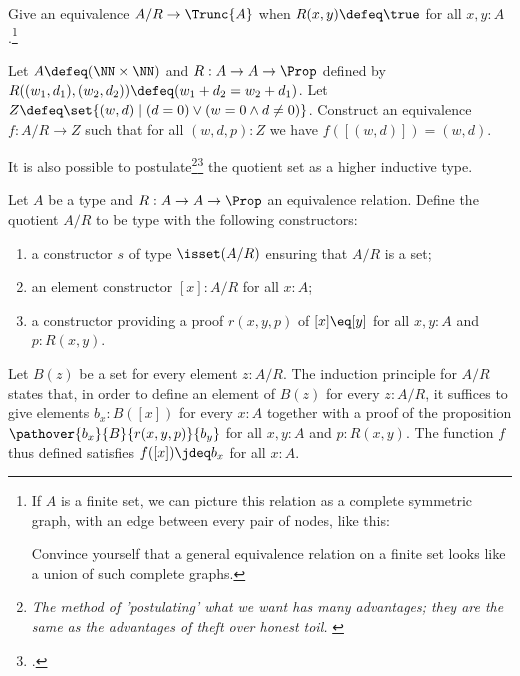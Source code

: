 \begin{xca}\label{xca:A/True-prop-trunc}
Give an equivalence $A/R \to \Trunc{A}$ when $R(x,y)\defeq\true$
for all $x,y:A$.\footnote{%
  If $A$ is a finite set, we can picture this relation as a complete
  symmetric graph, \ie with an edge between every pair of nodes, like this:\\
  \begin{center}
  \end{center}
  Convince yourself that a general equivalence relation
  on a finite set looks like a union of such complete graphs.}
\end{xca}

\begin{xca}\label{xca:ints-as-quotient}
Let $A\defeq(\NN\times\NN)$ and $R: A\to A\to\Prop$ defined by
$R((w_1,d_1),(w_2,d_2)) \defeq  (w_1+d_2 = w_2 + d_1)$.
Let $Z \defeq \set{(w,d)\mid (d=0) \lor (w=0 \land d\ne 0)}$.
Construct an equivalence $f: A/R\to Z$ such that for all
$(w,d,p):Z$ we have $f([(w,d)]) = (w,d)$.
\end{xca}

It is also possible to postulate\footnote{%
\emph{The method of 'postulating' what we want has many advantages;
  they are the same as the advantages of theft over honest toil.}\hfill
\citeauthor{russell-intro-mp}\footnotemark{}}\footcitetext{russell-intro-mp}
the quotient set as a higher inductive type.

\begin{definition}\label{def:quotient-as-HIT}
  Let $A$ be a type and $R : A \to A \to \Prop$ an equivalence relation.
  Define the quotient $A/R$ to be type with the following constructors:
  \begin{enumerate}
  \item a constructor $s$ of type $\isset(A/R)$ ensuring that $A/R$ is a set;
  \item an element constructor $[x] : A/R$ for all $x:A$;
  \item a constructor providing a proof $r(x,y,p)$ of
  $[x] \eq [y]$ for all $x,y : A$ and $p:R(x,y)$.
  \end{enumerate}
  Let $B(z)$ be a set for every element $z:A/R$. The induction principle
  for $A/R$ states that, in order to define an element of $B(z)$
  for every $z:A/R$,
  it suffices to give elements $b_x : B([x])$ for every $x:A$
  together with a proof of the proposition
  $\pathover{b_x}{B}{r(x,y,p)}{b_y}$ for all $x,y:A$ and $p:R(x,y)$.
  The function $f$ thus defined satisfies $f([x])\jdeq b_x$ for all $x:A$.
\end{definition}

